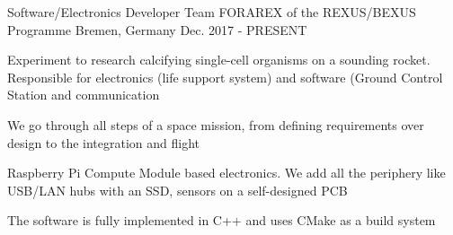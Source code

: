 

\begin{cventries}

  \cventry
    {Software/Electronics Developer} %
    {Team FORAREX of the REXUS/BEXUS Programme} %
    {Bremen, Germany} %
    {Dec. 2017 - PRESENT} %
    {
      \begin{cvitems} %
        \item {Experiment to research calcifying single-cell organisms on a sounding rocket. Responsible for electronics (life support system) and software (Ground Control Station and communication}
        \item {We go through all steps of a space mission, from defining requirements over design to the integration and flight}
        \item {Raspberry Pi Compute Module based electronics. We add all the periphery like USB/LAN hubs with an SSD, sensors on a self-designed PCB}
        \item {The software is fully implemented in C++ and uses CMake as a build system}
      \end{cvitems}
    }

\end{cventries}
